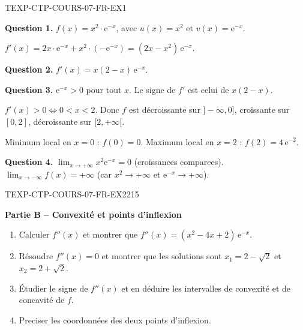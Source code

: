 \begin{corrige}{TEXP-CTP-COURS-07-FR-EX1}

\textbf{Question 1.} $f(x) = x^2 \cdot \mathrm{e}^{-x}$, avec $u(x) = x^2$ et $v(x) = \mathrm{e}^{-x}$.

$f'(x) = 2x \cdot \mathrm{e}^{-x} + x^2 \cdot (-\mathrm{e}^{-x}) = (2x - x^2)\,\mathrm{e}^{-x}$.

\textbf{Question 2.} $f'(x) = x(2-x)\,\mathrm{e}^{-x}$.

\textbf{Question 3.} $\mathrm{e}^{-x} > 0$ pour tout $x$. Le signe de $f'$ est celui de $x(2-x)$.

$f'(x) > 0 \iff 0 < x < 2$. Donc $f$ est décroissante sur $]-\infty, 0]$, croissante sur $[0, 2]$, décroissante sur $[2, +\infty[$.

Minimum local en $x = 0$ : $f(0) = 0$. Maximum local en $x = 2$ : $f(2) = 4\,\mathrm{e}^{-2}$.

\textbf{Question 4.} $\lim_{x \to +\infty} x^2 \mathrm{e}^{-x} = 0$ (croissances comparees). $\lim_{x \to -\infty} f(x) = +\infty$ (car $x^2 \to +\infty$ et $\mathrm{e}^{-x} \to +\infty$).

\end{corrige}

\bigskip


\begin{exercice}{TEXP-CTP-COURS-07-FR-EX2}{2}{15}

\textbf{Partie B -- Convexité et points d'inflexion}

\begin{enumerate}
  \item Calculer $f''(x)$ et montrer que $f''(x) = (x^2 - 4x + 2)\,\mathrm{e}^{-x}$.
  \item Résoudre $f''(x) = 0$ et montrer que les solutions sont $x_1 = 2 - \sqrt{2}$ et $x_2 = 2 + \sqrt{2}$.
  \item Étudier le signe de $f''(x)$ et en déduire les intervalles de convexité et de concavité de $f$.
  \item Preciser les coordonnées des deux points d'inflexion.
\end{enumerate}

\end{exercice}

